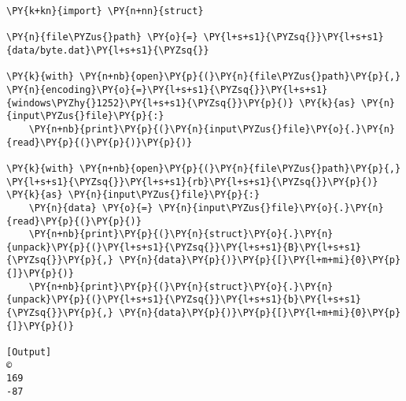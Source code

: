 \begin{Verbatim}[label=\makebox{\href{https://github.com/unipi-physics-labs/statnotes/tree/main/snippy/byte.py}{https://github.com/.../byte.py}},commandchars=\\\{\}]
\PY{k+kn}{import} \PY{n+nn}{struct}

\PY{n}{file\PYZus{}path} \PY{o}{=} \PY{l+s+s1}{\PYZsq{}}\PY{l+s+s1}{data/byte.dat}\PY{l+s+s1}{\PYZsq{}}

\PY{k}{with} \PY{n+nb}{open}\PY{p}{(}\PY{n}{file\PYZus{}path}\PY{p}{,} \PY{n}{encoding}\PY{o}{=}\PY{l+s+s1}{\PYZsq{}}\PY{l+s+s1}{windows\PYZhy{}1252}\PY{l+s+s1}{\PYZsq{}}\PY{p}{)} \PY{k}{as} \PY{n}{input\PYZus{}file}\PY{p}{:}
    \PY{n+nb}{print}\PY{p}{(}\PY{n}{input\PYZus{}file}\PY{o}{.}\PY{n}{read}\PY{p}{(}\PY{p}{)}\PY{p}{)}

\PY{k}{with} \PY{n+nb}{open}\PY{p}{(}\PY{n}{file\PYZus{}path}\PY{p}{,} \PY{l+s+s1}{\PYZsq{}}\PY{l+s+s1}{rb}\PY{l+s+s1}{\PYZsq{}}\PY{p}{)} \PY{k}{as} \PY{n}{input\PYZus{}file}\PY{p}{:}
    \PY{n}{data} \PY{o}{=} \PY{n}{input\PYZus{}file}\PY{o}{.}\PY{n}{read}\PY{p}{(}\PY{p}{)}
    \PY{n+nb}{print}\PY{p}{(}\PY{n}{struct}\PY{o}{.}\PY{n}{unpack}\PY{p}{(}\PY{l+s+s1}{\PYZsq{}}\PY{l+s+s1}{B}\PY{l+s+s1}{\PYZsq{}}\PY{p}{,} \PY{n}{data}\PY{p}{)}\PY{p}{[}\PY{l+m+mi}{0}\PY{p}{]}\PY{p}{)}
    \PY{n+nb}{print}\PY{p}{(}\PY{n}{struct}\PY{o}{.}\PY{n}{unpack}\PY{p}{(}\PY{l+s+s1}{\PYZsq{}}\PY{l+s+s1}{b}\PY{l+s+s1}{\PYZsq{}}\PY{p}{,} \PY{n}{data}\PY{p}{)}\PY{p}{[}\PY{l+m+mi}{0}\PY{p}{]}\PY{p}{)}

[Output]
©
169
-87
\end{Verbatim}
